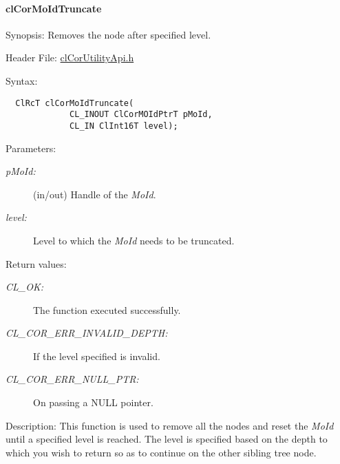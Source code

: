 \hypertarget{pagecor231}{}\paragraph{cl\-Cor\-Mo\-Id\-Truncate}\label{pagecor231}
\begin{Desc}
\item[Synopsis:]Removes the node after specified level.\end{Desc}
\begin{Desc}
\item[Header File:]\hyperlink{cl_cor_utility_api_8h}{cl\-Cor\-Utility\-Api.h}\end{Desc}
\begin{Desc}
\item[Syntax:]

\footnotesize\begin{verbatim}  ClRcT clCorMoIdTruncate(
             CL_INOUT ClCorMOIdPtrT pMoId,
             CL_IN ClInt16T level);
\end{verbatim}
\normalsize
\end{Desc}
\begin{Desc}
\item[Parameters:]
\begin{description}
\item[{\em p\-Mo\-Id:}](in/out) Handle of the {\em Mo\-Id\/}. \item[{\em level:}]Level to which the {\em Mo\-Id\/} needs to be truncated.\end{description}
\end{Desc}
\begin{Desc}
\item[Return values:]
\begin{description}
\item[{\em CL\_\-OK:}]The function executed successfully. \item[{\em CL\_\-COR\_\-ERR\_\-INVALID\_\-DEPTH:}]If the level specified is invalid. \item[{\em CL\_\-COR\_\-ERR\_\-NULL\_\-PTR:}]On passing a NULL pointer.\end{description}
\end{Desc}
\begin{Desc}
\item[Description:]This function is used to remove all the nodes and reset the {\em Mo\-Id\/} until a specified level is reached. The level is specified based on the depth to which you wish to return so as to continue on the other sibling tree node.\end{Desc}
